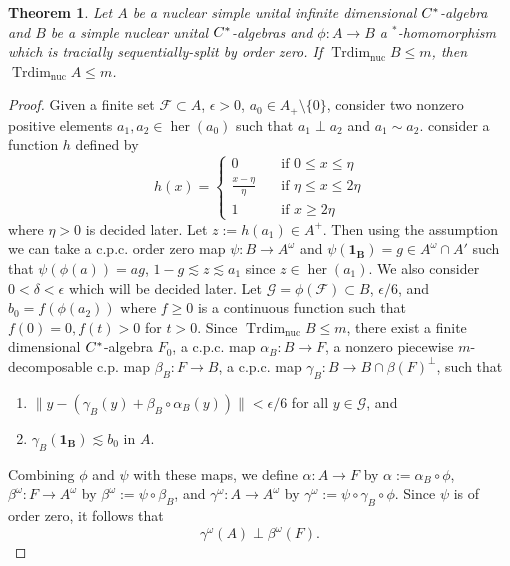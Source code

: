 \documentclass[12pt]{amsart}
\theoremstyle{plain}
\newtheorem{thm}{Theorem}[section]
\theoremstyle{definition}
\def\her{\operatorname{her}}
\def\Trdim{\operatorname{Trdim}}
\def\nuc{\operatorname{nuc}}
\newcommand{\mc}{\mathcal}
\numberwithin{equation}{section}
\begin{document}
\begin{thm}\label{T:Trdim}
Let $A$ be a nuclear simple unital infinite dimensional $C\sp*$-algebra and $B$ be a simple nuclear unital $C\sp*$-algebras and $\phi: A \to B $ a $^*$-homomorphism which is tracially sequentially-split by order zero. If $\Trdim_{\nuc} B \le m $, then $\Trdim_{\nuc} A \le m$. 
\end{thm}
\begin{proof} 
Given a finite set $\mc{F} \subset A$, $\epsilon>0$, $a_0 \in A_{+} \setminus \{ 0\}$, consider two nonzero positive elements $a_1, a_2 \in \her(a_0)$ such that $a_1 \perp a_2$ and $a_1 \sim a_2$.  consider a function $h$ defined by 
\[
 h(x)=\begin{cases}
 0 \quad & \text{if $0 \le x \le \eta$}\\
 \frac{x-\eta}{\eta} \quad & \text{if $\eta \le x \le 2\eta$}\\
 1 \quad &\text{if $x \ge 2 \eta$}
  \end{cases}
\] 
where $\eta >0$ is decided later.  Let $z:= h(a_1) \in A^{+}$. 
Then using the assumption we can take a c.p.c. order zero map $\psi: B \to A^{\omega}$  and $\psi(\mathbf{1_B})=g \in A^{\omega}\cap A'$ such that $\psi(\phi(a))=ag$,  $1- g \lesssim z \lesssim a_1$ since $z \in \her(a_1)$. 
We also consider $0< \delta < \epsilon$ which will be decided later.  Let $\mc{G}=\phi(\mc{F}) \subset B$, $\epsilon/6$, and $b_0=f(\phi(a_2))$ where $f\ge 0$ is a continuous function such that $f(0)=0, f(t)> 0$  for $t>0$. 
Since $\Trdim_{\nuc} B \le m$, there exist a finite dimensional $C\sp*$-algebra $F_0$, a c.p.c. map $\alpha_B: B \to F$, a nonzero piecewise $m$-decomposable c.p. map $\beta_B: F \to B$, a c.p.c. map $\gamma_B: B \to B\cap \beta(F)^{\perp}$, such that  
 \begin{enumerate}
\item $ \|y - (\gamma_B(y)+ \beta_B \circ \alpha_B (y) )\| < \epsilon/6$ for all $y\in \mc{G}$, and 
\item $\gamma_B(\mathbf{1_B}) \lesssim b_0$ in $A$. 
\end{enumerate}
Combining $\phi$ and $\psi$ with these maps, we define $\alpha: A \to F$ by $\alpha:= \alpha_B \circ \phi$,  $\beta^{\omega}: F \to A^{\omega}$ by $\beta^{\omega}:=\psi \circ \beta_B$, and $\gamma^{\omega}: A \to A^{\omega}$ by $\gamma^{\omega}:=\psi \circ \gamma_B \circ \phi$. Since $\psi$ is of order zero, it follows that \[\gamma^{\omega}(A) \perp \beta^{\omega}(F). \]


\end{proof}
\end{document}
